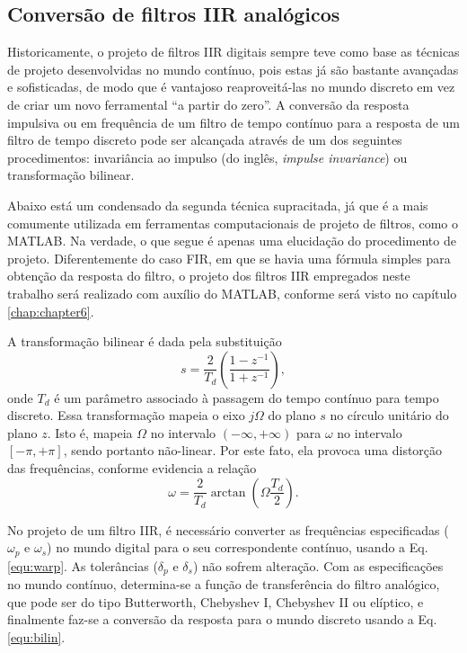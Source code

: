 \subsection*{Conversão de filtros IIR analógicos}
Historicamente, o projeto de filtros IIR digitais sempre teve como base as técnicas de projeto desenvolvidas no mundo contínuo, pois estas já são bastante avançadas e sofisticadas, de modo que é vantajoso reaproveitá-las no mundo discreto em vez de criar um novo ferramental ``a partir do zero''. A conversão da resposta impulsiva ou em frequência de um filtro de tempo contínuo para a resposta de um filtro de tempo discreto pode ser alcançada através de um dos seguintes procedimentos: invariância ao impulso (do inglês, \emph{impulse invariance}) ou transformação bilinear.

Abaixo está um condensado da segunda técnica supracitada, já que é a mais comumente utilizada em ferramentas computacionais de projeto de filtros, como o MATLAB. Na verdade, o que segue é apenas uma elucidação do procedimento de projeto. Diferentemente do caso FIR, em que se havia uma fórmula simples para obtenção da resposta do filtro, o projeto dos filtros IIR empregados neste trabalho será realizado com auxílio do MATLAB, conforme será visto no capítulo \ref{chap:chapter6}.

A transformação bilinear é dada pela substituição
\begin{equation}
     s = \frac{2}{T_d} \left(\frac{1-z^{-1}}{1+z^{-1}}\right),
     \label{equ:bilin}
\end{equation}
onde $T_d$ é um parâmetro associado à passagem do tempo contínuo para tempo discreto. Essa transformação mapeia o eixo $j\Omega$ do plano $s$ no círculo unitário do plano $z$. Isto é, mapeia $\Omega$ no intervalo $(-\infty,+\infty)$ para $\omega$ no intervalo $[-\pi,+\pi]$, sendo portanto não-linear. Por este fato, ela provoca uma distorção das frequências, conforme evidencia a relação
\begin{equation}
     \omega = \frac{2}{T_d} \arctan\left(\Omega \frac{T_d}{2}\right).
     \label{equ:warp}
\end{equation}

No projeto de um filtro IIR, é necessário converter as frequências especificadas ($\omega_p$ e $\omega_s$) no mundo digital para o seu correspondente contínuo, usando a Eq. \ref{equ:warp}. As tolerâncias ($\delta_p$ e $\delta_s$) não sofrem alteração. Com as especificações no mundo contínuo, determina-se a função de transferência do filtro analógico, que pode ser do tipo Butterworth, Chebyshev I, Chebyshev II ou elíptico, e finalmente faz-se a conversão da resposta para o mundo discreto usando a Eq. \ref{equ:bilin}.


